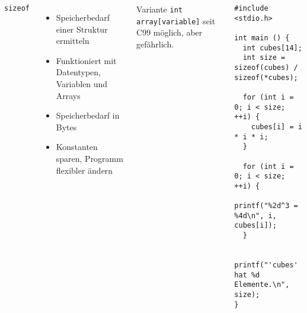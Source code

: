 \begin{frame}[fragile]
%
\begin{columns}[T]
\begin{Large}
{\texttt{sizeof}}
\vspace{6pt}
\end{Large}
%
\begin{itemize}
\item Speicherbedarf einer Struktur ermitteln
\item Funktioniert mit Datentypen, Variablen und Arrays
\item Speicherbedarf in Bytes
\item Konstanten sparen, Programm flexibler ändern
\end{itemize}
%
\begin{hintbox}
\footnotesize
Variante \texttt{int array[variable]} seit C99 möglich, aber gefährlich.
\end{hintbox}
%
%
\begin{codebox}
\begin{verbatim}
#include <stdio.h>

int main () {
  int cubes[14];
  int size = sizeof(cubes) / sizeof(*cubes);
  
  for (int i = 0; i < size; ++i) {
    cubes[i] = i * i * i;
  }
  
  for (int i = 0; i < size; ++i) {
    printf("%2d^3 = %4d\n", i, cubes[i]);
  }
  
  printf("'cubes' hat %d Elemente.\n", size);
}
\end{verbatim}
\end{codebox}
%
\end{columns}
%
\end{frame}



